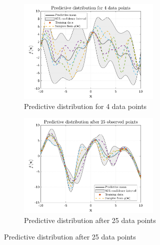 \begin{figure}[htp!]    
  \begin{subfigure}[b]{0.95\linewidth}
    \centering
    \includegraphics[trim={0 0.18cm 0 0.70cm},clip,height=0.27\textheight,width=0.75\textwidth]{Chapter3/Figures/func_uncertainty_1.png} 
    \caption{Predictive distribution for 4 data points} 
    \label{Fig:Re-pred-4-points} 
  \end{subfigure}

  \begin{subfigure}[b]{0.95\linewidth}
    \centering
    \includegraphics[trim={0 0.18cm 0 0.70cm},clip,height=0.27\textheight,width=0.75\textwidth]{Chapter3/Figures/func_uncertainty_2.png} 
    \caption{Predictive distribution after 25 data points} 
    \label{Fig:Re-pred-25-points}
  \end{subfigure}
  

\end{figure}
